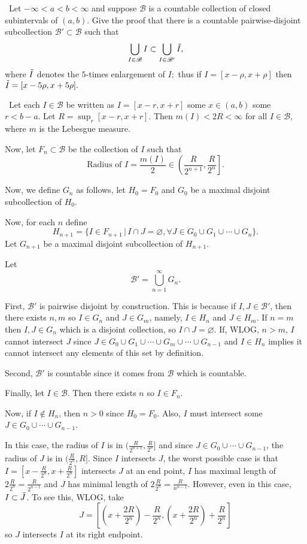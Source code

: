 \documentclass[12pt]{Qual}
\begin{document}
\begin{problem} $\,$
Let $-\infty<a<b<\infty$ and suppose $\mathscr{B}$ is a countable collection of closed subintervals of $(a,b).$ Give the proof that there is a countable pairwise-disjoint subcollection $\mathscr{B}'\subset\mathscr{B}$ such that $$\bigcup_{I\in\mathscr{B}}I\subset\bigcup_{I\in\mathscr{B}'}\Tilde{I},$$ where $\Tilde{I}$ denotes the $5$-times enlargement of $I;$ thus if $I=[x-\rho,x+\rho]$ then $\Tilde{I}=[x-5\rho,x+5\rho].$
\end{problem}


\begin{solution}$\,$
Let each $I\in\mathscr{B}$ be written as $I=[x-r,x+r]$ some $x\in (a,b)$ some $r<b-a$. Let $R=\sup_r[x-r,x+r]$. Then $m(I)<2R<\infty$ for all $I\in\mathscr{B}$, where $m$ is the Lebesgue measure.

Now, let $F_n\subset\mathscr{B}$ be the collection of $I$ such that $$\text{Radius of }I=\frac{m(I)}{2}\in\left(\frac{R}{2^{n+1}},\frac{R}{2^n}\right].$$

Now, we define $G_n$ as follows, let $H_0=F_0$ and $G_0$ be a maximal disjoint subcollection of $H_0$.

Now, for each $n$ define $$H_{n+1}=\{I\in F_{n+1}\,|\,I\cap J=\varnothing,\forall J\in G_0\cup G_1\cup\cdots\cup G_n\}.$$ Let $G_{n+1}$ be a maximal disjoint subcollection of $H_{n+1}.$

Let $$\mathscr{B}'=\bigcup_{n=1}^\infty G_n.$$

First, $\mathscr{B}'$ is pairwise disjoint by construction. This is because if $I,J\in\mathscr{B}'$, then there exists $n,m$ so $I\in G_n$ and $J\in G_m$, namely, $I\in H_n$ and $J\in H_m$. If $n=m$ then $I,J\in G_n$ which is a disjoint collection, so $I\cap J=\varnothing.$ If, WLOG, $n>m$, $I$ cannot intersect $J$ since $J\in G_0\cup G_1\cup\cdots\cup G_m\cup\cdots\cup G_{n-1}$ and $I\in H_n$ implies it cannot intersect any elements of this set by definition.

Second, $\mathscr{B}'$ is countable since it comes from $\mathscr{B}$ which is countable.

Finally, let $I\in\mathscr{B}$. Then there exists $n$ so $I\in F_n$.

Now, if $I\notin H_n$, then $n>0$ since $H_0=F_0$. Also, $I$ must intersect some $J\in G_0\cup\cdots\cup G_{n-1}$.

In this case, the radius of $I$ is in $(\frac{R}{2^{n+1}},\frac{R}{2^n}]$ and since $J\in G_0\cup\cdots\cup G_{n-1}$, the radius of $J$ is in $(\frac{R}{2^n},R]$. Since $I$ intersects $J$, the worst possible case is that $I=[x-\frac{R}{2^n},x+\frac{R}{2^n}]$ intersects $J$ at an end point, $I$ has maximal length of $2\frac{R}{2^n}=\frac{R}{2^{n-1}}$ and $J$ has minimal length of $2\frac{R}{2^n}=\frac{R}{n^{n-1}}$. However, even in this case, $I\subset \Tilde{J}$. To see this, WLOG, take $$J=\left[\left(x+\frac{2R}{2^n}\right)-\frac{R}{2^n},\left(x+\frac{2R}{2^n}\right)+\frac{R}{2^n}\right]$$ so $J$ intersects $I$ at its right endpoint.


\end{solution}
\end{document}
